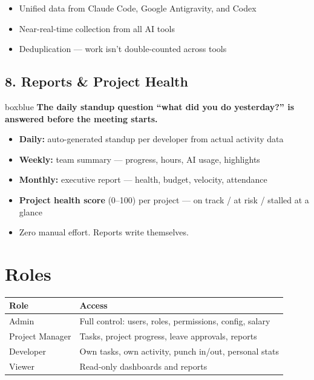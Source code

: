 \documentclass[12pt,a4paper]{article}
\begin{document}
\begin{itemize}[nosep]
    \item Unified data from Claude Code, Google Antigravity, and Codex
    \item Near-real-time collection from all AI tools
    \item Deduplication --- work isn't double-counted across tools
\end{itemize}

\subsection{8. Reports \& Project Health}

\begin{hookbox}{boxblue}
\textbf{The daily standup question ``what did you do yesterday?'' is answered before the meeting starts.}
\end{hookbox}

\begin{itemize}[nosep]
    \item \textbf{Daily:} auto-generated standup per developer from actual activity data
    \item \textbf{Weekly:} team summary --- progress, hours, AI usage, highlights
    \item \textbf{Monthly:} executive report --- health, budget, velocity, attendance
    \item \textbf{Project health score} (0--100) per project --- on track / at risk / stalled at a glance
    \item Zero manual effort. Reports write themselves.
\end{itemize}

\newpage
\section{Roles}

\begin{center}
\renewcommand{\arraystretch}{1.4}
\begin{tabularx}{\textwidth}{l X}
    \toprule
    \textbf{Role} & \textbf{Access} \\
    \midrule
    Admin & Full control: users, roles, permissions, config, salary \\
    Project Manager & Tasks, project progress, leave approvals, reports \\
    Developer & Own tasks, own activity, punch in/out, personal stats \\
    Viewer & Read-only dashboards and reports \\
    \bottomrule
\end{tabularx}
\end{center}
\end{document}
